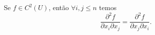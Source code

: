 

\begin{theorem} 
    Se \(f \in C^2(U)\), então \(\forall i,j \leq n\) temos  
    \[\frac{\partial^2 f}{\partial x_i \partial x_j} = \frac{\partial^2 f }{\partial x_j \partial x_i}.\]
\end{theorem}

